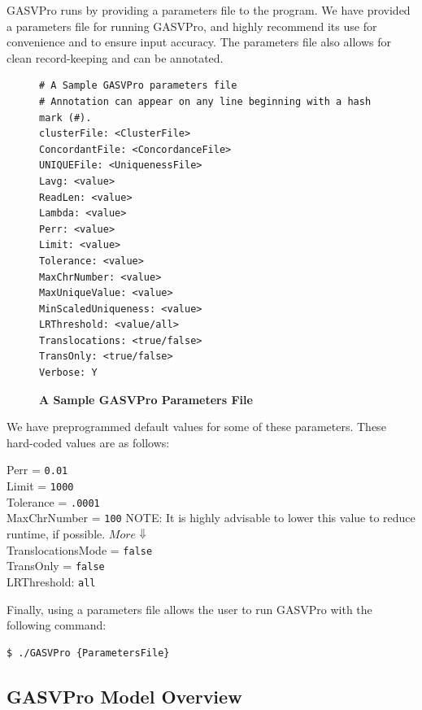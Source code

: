 \documentclass[11pt]{article}
\begin{document}
GASVPro runs by providing a parameters file to the program. We have provided a parameters file for running GASVPro, and highly recommend its use for convenience and to ensure input accuracy. The parameters file also allows for clean record-keeping and can be annotated.
\begin{figure}[H]
\begin{Verbatim}[frame=single]
# A Sample GASVPro parameters file
# Annotation can appear on any line beginning with a hash mark (#).
clusterFile: <ClusterFile>
ConcordantFile: <ConcordanceFile>
UNIQUEFile: <UniquenessFile>
Lavg: <value>
ReadLen: <value>
Lambda: <value>
Perr: <value>
Limit: <value>
Tolerance: <value>
MaxChrNumber: <value>
MaxUniqueValue: <value>
MinScaledUniqueness: <value>
LRThreshold: <value/all>
Translocations: <true/false>
TransOnly: <true/false>
Verbose: Y
\end{Verbatim}
\caption{\bf A Sample GASVPro Parameters File}
\end{figure}
\noindent We have preprogrammed default values for some of these parameters. These hard-coded values are as follows:
\begin{framed}
\noindent Perr = \verb+0.01+\\
Limit = \verb+1000+\\
Tolerance = \verb+.0001+\\
MaxChrNumber = \verb+100+ {\scriptsize NOTE: It is highly advisable to lower this value to reduce runtime, if possible.} $More \Downarrow$ \\
TranslocationsMode = \verb+false+\\
TransOnly = \verb+false+\\
LRThreshold: \verb+all+
\end{framed}
\noindent Finally, using a parameters file allows the user to run GASVPro with the following command:
	\begin{Verbatim}[frame=single]
$ ./GASVPro {ParametersFile}
	\end{Verbatim}

\subsection{GASVPro Model Overview}
\end{document}
